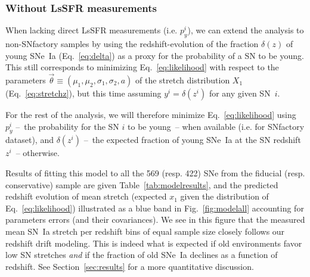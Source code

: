 \documentclass[]{aa} %
\newcommand{\mr}[1]{{\textcolor[rgb]{0.60,0.10,0.6}{#1}}}
\begin{document}
\subsubsection{Without LsSFR measurements}\label{sec:modelnopy}

When lacking direct LsSFR measurements (i.e. $p_y^i$), we can extend the
analysis to non-SNfactory samples by using the redshift-evolution of the
fraction $\delta(z)$ of young SNe~Ia (Eq.~\ref{eq:delta}) as a proxy for the
probability of a SN to be young. This still corresponds to minimizing
Eq.~\ref{eq:likelihood} with respect to the parameters
$\vec{\theta}\equiv(\mu_1, \mu_2, \sigma_1, \sigma_2, a)$ of the stretch
distribution $X_1$ (Eq.~\ref{eq:stretchz}), but this time assuming $y^i =
\delta(z^i)$ for any given SN~$i$. 

For the rest of the analysis, we will therefore minimize Eq.~\ref{eq:likelihood}
using $p_y^i$ --~the probability for the SN $i$ to be young~-- when available
(i.e. for SNfactory dataset), and $\delta(z^i)$ --~the expected fraction of
young SNe~Ia at the SN redshift $z^i$~-- otherwise.

Results of fitting this model to all the 569 (resp. 422) SNe from the fiducial
(resp. conservative) sample are given Table~\ref{tab:modelresults}, and the predicted redshift evolution of mean stretch \mr{(expected $x_1$ given the distribution of Eq.~\ref{eq:likelihood})
illustrated as a blue band in Fig.~\ref{fig:modelall} accounting for parameters errors (and their covariances)}. 
We see in this figure
that the measured mean SN~Ia stretch per redshift bins of equal sample size
closely follows our redshift drift modeling. This is indeed what is expected if
old environments favor low SN stretches \citep[e.g.][]{howell2007} \emph{and} if
the fraction of old SNe~Ia declines as a function of redshift. See
Section~\ref{sec:results} for a more quantitative discussion.
\end{document}
